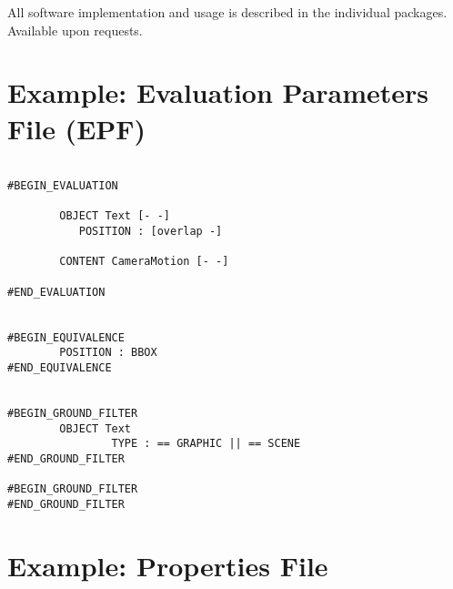 All software implementation and usage is described in the individual
packages.  Available upon requests.

\appendix

\newpage
\section{Example: Evaluation Parameters File (EPF)}
\label{a:epf}

\begin{verbatim}

#BEGIN_EVALUATION

        OBJECT Text [- -]
           POSITION : [overlap -]

        CONTENT CameraMotion [- -]

#END_EVALUATION


#BEGIN_EQUIVALENCE
        POSITION : BBOX
#END_EQUIVALENCE


#BEGIN_GROUND_FILTER
        OBJECT Text
                TYPE : == GRAPHIC || == SCENE
#END_GROUND_FILTER

#BEGIN_GROUND_FILTER
#END_GROUND_FILTER
\end{verbatim}
\newpage

\newpage 
\section{Example: Properties File}
\label{a:prop}

